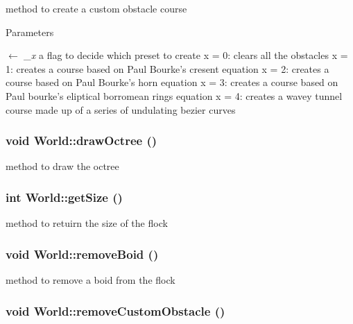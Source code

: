 method to create a custom obstacle course 
\begin{DoxyParams}{Parameters}
\item[\mbox{$\leftarrow$} {\em \_\-x}]a flag to decide which preset to create x = 0: clears all the obstacles x = 1: creates a course based on Paul Bourke's cresent equation x = 2: creates a course based on Paul Bourke's horn equation x = 3: creates a course based on Paul bourke's eliptical borromean rings equation x = 4: creates a wavey tunnel course made up of a series of undulating bezier curves \end{DoxyParams}
\hypertarget{classWorld_a7123d3ffafa97f55950368dca30953a6}{
\subsubsection[{drawOctree}]{\setlength{\rightskip}{0pt plus 5cm}void World::drawOctree ()}}
\label{classWorld_a7123d3ffafa97f55950368dca30953a6}


method to draw the octree \hypertarget{classWorld_a1951be71ff041b9857bce6c4fe47a31c}{
\subsubsection[{getSize}]{\setlength{\rightskip}{0pt plus 5cm}int World::getSize ()}}
\label{classWorld_a1951be71ff041b9857bce6c4fe47a31c}


method to retuirn the size of the flock \hypertarget{classWorld_a7269569ed79ac31185a04d817c6cb597}{
\subsubsection[{removeBoid}]{\setlength{\rightskip}{0pt plus 5cm}void World::removeBoid ()}}
\label{classWorld_a7269569ed79ac31185a04d817c6cb597}


method to remove a boid from the flock \hypertarget{classWorld_a678be12ee2c2754abb91639610115fa2}{
\subsubsection[{removeCustomObstacle}]{\setlength{\rightskip}{0pt plus 5cm}void World::removeCustomObstacle ()}}
\label{classWorld_a678be12ee2c2754abb91639610115fa2}


